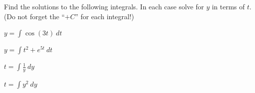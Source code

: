 


\begin{problem}
\item Find the solutions to the following integrals. In each case
  solve for $y$ in terms of $t$. (Do not forget the ``$+C$'' for each
  integral!)
  \begin{subproblem}
    \item $y = \int \cos(3t) ~ dt$
      \vfill
    \item $y = \int t^2 + e^{5t} ~ dt$
      \vfill
    \item $t = \int \frac{1}{y} ~ dy$
      \vfill
    \item $t = \int y^2 ~ dy$
      \vfill
  \end{subproblem}  
\end{problem}


